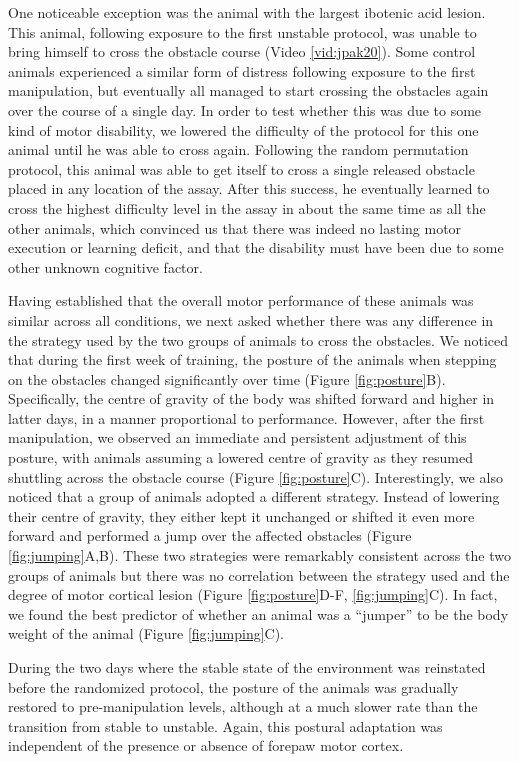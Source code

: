 One noticeable exception was the animal with the largest ibotenic acid lesion. This animal, following exposure to the first unstable protocol, was unable to bring himself to cross the obstacle course (Video \ref{vid:jpak20}). Some control animals experienced a similar form of distress following exposure to the first manipulation, but eventually all managed to start crossing the obstacles again over the course of a single day. In order to test whether this was due to some kind of motor disability, we lowered the difficulty of the protocol for this one animal until he was able to cross again. Following the random permutation protocol, this animal was able to get itself to cross a single released obstacle placed in any location of the assay. After this success, he eventually learned to cross the highest difficulty level in the assay in about the same time as all the other animals, which convinced us that there was indeed no lasting motor execution or learning deficit, and that the disability must have been due to some other unknown cognitive factor. 

Having established that the overall motor performance of these animals was similar across all conditions, we next asked whether there was any difference in the strategy used by the two groups of animals to cross the obstacles. We noticed that during the first week of training, the posture of the animals when stepping on the obstacles changed significantly over time (Figure \ref{fig:posture}B). Specifically, the centre of gravity of the body was shifted forward and higher in latter days, in a manner proportional to performance. However, after the first manipulation, we observed an immediate and persistent adjustment of this posture, with animals assuming a lowered centre of gravity as they resumed shuttling across the obstacle course (Figure \ref{fig:posture}C). Interestingly, we also noticed that a group of animals adopted a different strategy. Instead of lowering their centre of gravity, they either kept it unchanged or shifted it even more forward and performed a jump over the affected obstacles (Figure \ref{fig:jumping}A,B). These two strategies were remarkably consistent across the two groups of animals but there was no correlation between the strategy used and the degree of motor cortical lesion (Figure \ref{fig:posture}D-F, \ref{fig:jumping}C). In fact, we found the best predictor of whether an animal was a ``jumper'' to be the body weight of the animal (Figure \ref{fig:jumping}C).

During the two days where the stable state of the environment was reinstated before the randomized protocol, the posture of the animals was gradually restored to pre-manipulation levels, although at a much slower rate than the transition from stable to unstable. Again, this postural adaptation was independent of the presence or absence of forepaw motor cortex.

